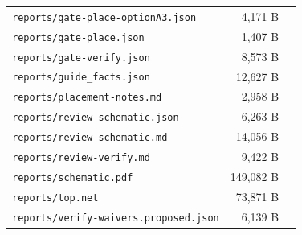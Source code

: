 \documentclass[11pt,a4paper]{article}
\begin{document}
{\begin{longtable}{p{9cm}rp{4cm}}
\texttt{reports/gate-place-optionA3.json} & 4,171 B &  \\
\texttt{reports/gate-place.json} & 1,407 B &  \\
\texttt{reports/gate-verify.json} & 8,573 B &  \\
\texttt{reports/guide\_facts.json} & 12,627 B &  \\
\texttt{reports/placement-notes.md} & 2,958 B &  \\
\texttt{reports/review-schematic.json} & 6,263 B &  \\
\texttt{reports/review-schematic.md} & 14,056 B &  \\
\texttt{reports/review-verify.md} & 9,422 B &  \\
\texttt{reports/schematic.pdf} & 149,082 B &  \\
\texttt{reports/top.net} & 73,871 B &  \\
\texttt{reports/verify-waivers.proposed.json} & 6,139 B &  \\
\bottomrule
\end{longtable}
}
\end{document}
